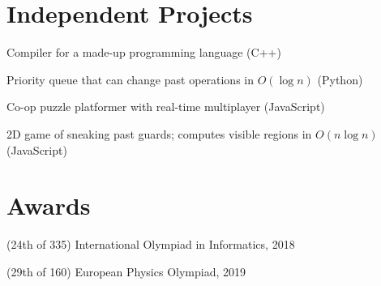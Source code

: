 \documentclass[letterpaper,11pt]{article}
\begin{document}
\section*{Independent Projects}
\begin{description}[labelwidth=3.75em]
    \item[\href{https://github.com/Alaxe/nitwit}{Nitwit}]
        Compiler for a made-up programming language (C++)
    \item[\href{https://github.com/6851-2021/retroactive-priority-queue}{retropq}]
        Priority queue that can change past operations in $O(\log n)$
        (Python)
    \item[\href{https://github.com/Alaxe/gemini}{Gemini}]
        Co-op puzzle platformer with real-time multiplayer (JavaScript)
    \item[\href{https://github.com/Alaxe/stealth}{Stealth}]
        2D game of sneaking past guards; computes visible regions in $O(n \log n)$
        (JavaScript)
\end{description}

\section*{Awards}
\begin{description}[labelwidth=6.25em]
    \item[Gold medal] (24th of 335) International Olympiad in Informatics, 2018
    \item[Silver medal] (29th of 160) European Physics Olympiad, 2019
\end{description}
\end{document}

